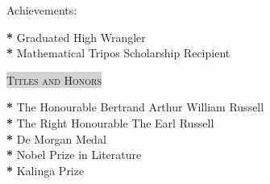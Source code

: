 \documentclass[a4paper, oneside, final]{scrartcl}
\begin{document}
\begin{center}
\begin{multicols}{2}
        \begin{flushleft}
            \small{Achievements}: 
        \end{flushleft}
        \begin{flushleft}
            \small{\bf{*}} Graduated High Wrangler  \\
            \small{\bf{*}} Mathematical Tripos Scholarship Recipient
        \end{flushleft}

        \parbox{\columnwidth} {
            \colorbox{LightGrey} {
                \textsc{\small{Titles and Honors}}
            }
        }

        \begin{flushleft}
            \small{\bf{*}} The Honourable Bertrand Arthur William Russell \\
            \small{\bf{*}} The Right Honourable The Earl Russell \\
            \small{\bf{*}} De Morgan Medal \\
            \small{\bf{*}} Nobel Prize in Literature \\
            \small{\bf{*}} Kalinga Prize
        \end{flushleft}

    \end{multicols}

\end{center}
\end{document}
